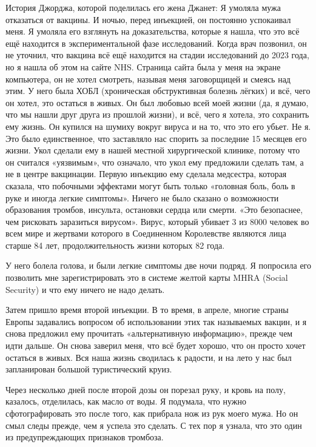 История Джорджа, которой поделилась его жена Джанет: Я умоляла мужа отказаться
от вакцины. И ночью, перед инъекцией, он постоянно успокаивал меня. Я умоляла
его взглянуть на доказательства, которые я нашла, что это всё ещё находится в
экспериментальной фазе исследований. Когда врач позвонил, он не уточнил, что
вакцина всё ещё находится на стадии исследований до 2023 года, но я нашла об
этом на сайте NHS. Страница сайта была у меня на экране компьютера, он не хотел
смотреть, называя меня заговорщицей и смеясь над этим. У него была ХОБЛ
(хроническая обструктивная болезнь лёгких) и всё, чего он хотел, это остаться в
живых. Он был любовью всей моей жизни (да, я думаю, что мы нашли друг друга из
прошлой жизни), и всё, чего я хотела, это сохранить ему жизнь. Он купился на
шумиху вокруг вируса и на то, что это его убьет. Не я. Это было единственное,
что заставляло нас спорить за последние 15 месяцев его жизни. Укол сделали ему в
нашей местной хирургической клинике, потому что он считался «уязвимым», что
означало, что укол ему предложили сделать там, а не в центре вакцинации. Первую
инъекцию ему сделала медсестра, которая сказала, что побочными эффектами могут
быть только «головная боль, боль в руке и иногда легкие симптомы». Ничего не
было сказано о возможности образования тромбов, инсульта, остановки сердца или
смерти. «Это безопаснее, чем рисковать заразиться вирусом». Вирус, который
убивает 3 из 8000 человек во всем мире и жертвами которого в Соединенном
Королевстве являются лица старше 84 лет, продолжительность жизни которых 82
года.

У него болела голова, и были легкие симптомы две ночи подряд. Я попросила его
позволить мне зарегистрировать это в системе желтой карты MHRA (Social Security)
и что ему ничего не надо делать.

Затем пришло время второй инъекции. В то время, в апреле, многие страны Европы
задавались вопросом об использовании этих так называемых вакцин, и я снова
предложил ему прочитать «альтернативную информацию», прежде чем идти дальше. Он
снова заверил меня, что всё будет хорошо, что он просто хочет остаться в
живых. Вся наша жизнь сводилась к радости, и на лето у нас был запланирован
большой туристический круиз.

Через несколько дней после второй дозы он порезал руку, и кровь на полу,
казалось, отделилась, как масло от воды. Я подумала, что нужно сфотографировать
это после того, как прибрала нож из рук моего мужа. Но он смыл следы прежде, чем
я успела это сделать. С тех пор я узнала, что это один из предупреждающих
признаков тромбоза.

